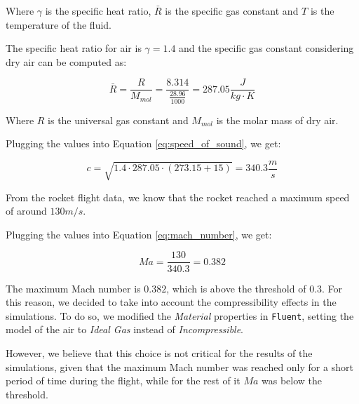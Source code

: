 Where $\gamma$ is the specific heat ratio, $\bar{R}$ is the specific gas constant and $T$ is the temperature of the fluid.

The specific heat ratio for air is $\gamma = 1.4$ and the specific gas constant considering dry air can be computed as:

\begin{equation}
    \bar{R} = \frac{R}{M_{mol}} = \frac{8.314}{\frac{28.96}{1000}} = 287.05 \frac{J}{kg \cdot K}
\end{equation}

Where $R$ is the universal gas constant and $M_{mol}$ is the molar mass of dry air.

Plugging the values into Equation \ref{eq:speed_of_sound}, we get:

\begin{equation}
    c = \sqrt{1.4 \cdot 287.05 \cdot (273.15 + 15)} = 340.3 \frac{m}{s}
\end{equation}

From the rocket flight data, we know that the rocket reached a maximum speed of around $130m/s$.

Plugging the values into Equation \ref{eq:mach_number}, we get:

\begin{equation}
    Ma = \frac{130}{340.3} = 0.382
\end{equation}

The maximum Mach number is $0.382$, which is above the threshold of $0.3$.
For this reason, we decided to take into account the compressibility effects in the simulations.
To do so, we modified the \textit{Material} properties in \texttt{Fluent}, setting the model of the air to \textit{Ideal Gas} instead of \textit{Incompressible}.

However, we believe that this choice is not critical for the results of the simulations, given that the maximum Mach number was reached only for a short period of time during the flight, while for the rest of it $Ma$ was below the threshold.
